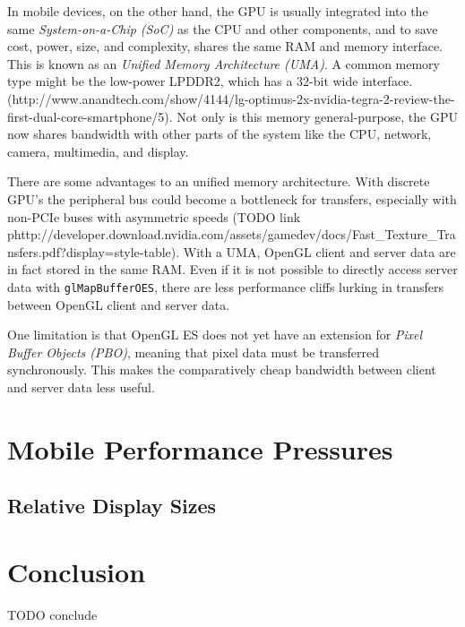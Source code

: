 In mobile devices, on the other hand, the GPU is usually integrated into the same \textit{System-on-a-Chip (SoC)} as the CPU and other components, and to save cost, power, size, and complexity, shares the same RAM and memory interface.  This is known as an \textit{Unified Memory Architecture (UMA)}.  A common memory type might be the low-power LPDDR2, which has a 32-bit wide interface. (http://www.anandtech.com/show/4144/lg-optimus-2x-nvidia-tegra-2-review-the-first-dual-core-smartphone/5).  Not only is this memory general-purpose, the GPU now shares bandwidth with other parts of the system like the CPU, network, camera, multimedia, and display.   

There are some advantages to an unified memory architecture.  With discrete GPU's the peripheral bus could become a bottleneck for transfers, especially with non-PCIe buses with asymmetric speeds (TODO link phttp://developer.download.nvidia.com/assets/gamedev/docs/Fast_Texture_Transfers.pdf?display=style-table).  With a UMA, OpenGL client and server data are in fact stored in the same RAM.  Even if it is not possible to directly access server data with \texttt{glMapBufferOES}, there are less performance cliffs lurking in transfers between OpenGL client and server data.

One limitation is that OpenGL ES does not yet have an extension for \textit{Pixel Buffer Objects (PBO)}, meaning that pixel data must be transferred synchronously.  This makes the comparatively cheap bandwidth between client and server data less useful.

\section{Mobile Performance Pressures}\label{Jon-McCaffrey:differences-in-memory-architecture}
\subsection{Relative Display Sizes}\label{Jon-McCaffrey:differences-in-memory-architecture}



\section{Conclusion}

TODO conclude















